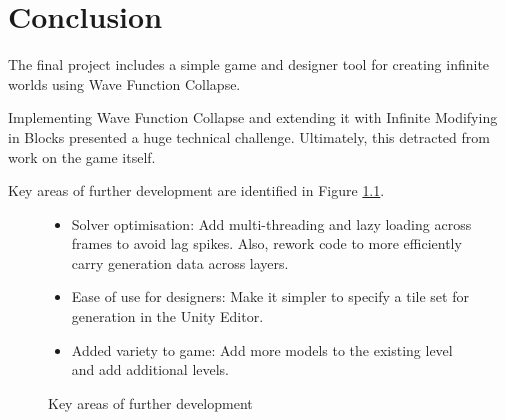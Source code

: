 \chapter{Conclusion}
The final project includes a simple game and designer tool for creating infinite worlds using Wave Function Collapse.

Implementing Wave Function Collapse and extending it with Infinite Modifying in Blocks presented a huge technical challenge. Ultimately, this detracted from work on the game itself.

Key areas of further development are identified in Figure \ref{fig:futureGoals}.

\begin{figure}[H]
    \begin{framed}
        \begin{itemize}
            \item Solver optimisation: Add multi-threading and lazy loading across frames to avoid lag spikes. Also, rework code to more efficiently carry generation data across layers.
            \item Ease of use for designers: Make it simpler to specify a tile set for generation in the Unity Editor.
            \item Added variety to game: Add more models to the existing level and add additional levels.
        \end{itemize}
    \end{framed}
    \caption{Key areas of further development}
    \label{fig:futureGoals}
\end{figure}